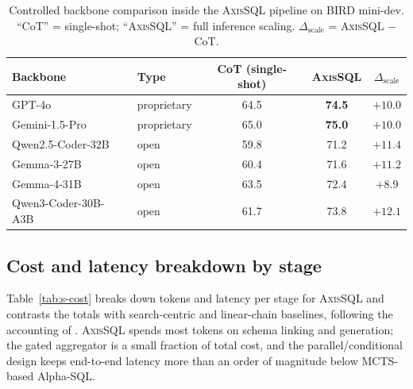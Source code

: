 \documentclass{article}
\newcommand{\sys}{\textsc{AxisSQL}\xspace}
\begin{document}
\begin{table}[h]
\centering\small
\caption{Controlled backbone comparison inside the \sys{} pipeline on BIRD mini-dev. ``CoT'' = single-shot; ``\sys'' = full inference scaling. $\Delta_{\text{scale}}$ = \sys{} $-$ CoT.}
\label{tab:s-openprop}
\begin{tabular}{@{}llccc@{}}
\toprule
\textbf{Backbone} & \textbf{Type} & \textbf{CoT (single-shot)} & \textbf{\sys} & $\Delta_{\text{scale}}$ \\
\midrule
GPT-4o \citep{hurst2024gpt4o}        & proprietary & 64.5 & \textbf{74.5} & $+10.0$ \\
Gemini-1.5-Pro \citep{team2024gemini15} & proprietary & 65.0 & \textbf{75.0} & $+10.0$ \\
\midrule
Qwen2.5-Coder-32B \citep{hui2024qwen25coder} & open & 59.8 & 71.2 & $+11.4$ \\
Gemma-3-27B \citep{kamath2025gemma3}        & open & 60.4 & 71.6 & $+11.2$ \\
Gemma-4-31B                                  & open & 63.5 & 72.4 & $+8.9$ \\
Qwen3-Coder-30B-A3B \citep{yang2025qwen3}    & open & 61.7 & 73.8 & $+12.1$ \\
\bottomrule
\end{tabular}
\end{table}

\subsection{Cost and latency breakdown by stage}
\label{app:cost}
Table~\ref{tab:s-cost} breaks down tokens and latency per stage for \sys{} and contrasts the totals with search-centric and linear-chain baselines, following the accounting of \citet{li2026deepeye}. \sys{} spends most tokens on schema linking and generation; the gated aggregator is a small fraction of total cost, and the parallel/conditional design keeps end-to-end latency more than an order of magnitude below MCTS-based Alpha-SQL.
\end{document}
